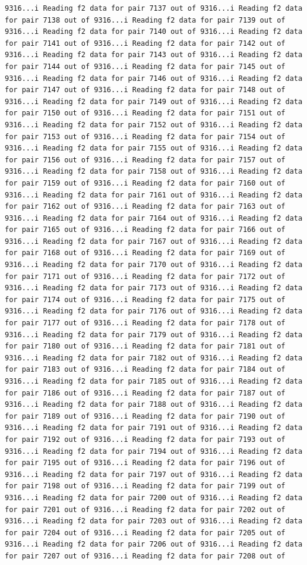 \documentclass[
]{article}
\begin{document}
\begin{verbatim}
9316...i Reading f2 data for pair 7137 out of 9316...i Reading f2 data for pair 7138 out of 9316...i Reading f2 data for pair 7139 out of 9316...i Reading f2 data for pair 7140 out of 9316...i Reading f2 data for pair 7141 out of 9316...i Reading f2 data for pair 7142 out of 9316...i Reading f2 data for pair 7143 out of 9316...i Reading f2 data for pair 7144 out of 9316...i Reading f2 data for pair 7145 out of 9316...i Reading f2 data for pair 7146 out of 9316...i Reading f2 data for pair 7147 out of 9316...i Reading f2 data for pair 7148 out of 9316...i Reading f2 data for pair 7149 out of 9316...i Reading f2 data for pair 7150 out of 9316...i Reading f2 data for pair 7151 out of 9316...i Reading f2 data for pair 7152 out of 9316...i Reading f2 data for pair 7153 out of 9316...i Reading f2 data for pair 7154 out of 9316...i Reading f2 data for pair 7155 out of 9316...i Reading f2 data for pair 7156 out of 9316...i Reading f2 data for pair 7157 out of 9316...i Reading f2 data for pair 7158 out of 9316...i Reading f2 data for pair 7159 out of 9316...i Reading f2 data for pair 7160 out of 9316...i Reading f2 data for pair 7161 out of 9316...i Reading f2 data for pair 7162 out of 9316...i Reading f2 data for pair 7163 out of 9316...i Reading f2 data for pair 7164 out of 9316...i Reading f2 data for pair 7165 out of 9316...i Reading f2 data for pair 7166 out of 9316...i Reading f2 data for pair 7167 out of 9316...i Reading f2 data for pair 7168 out of 9316...i Reading f2 data for pair 7169 out of 9316...i Reading f2 data for pair 7170 out of 9316...i Reading f2 data for pair 7171 out of 9316...i Reading f2 data for pair 7172 out of 9316...i Reading f2 data for pair 7173 out of 9316...i Reading f2 data for pair 7174 out of 9316...i Reading f2 data for pair 7175 out of 9316...i Reading f2 data for pair 7176 out of 9316...i Reading f2 data for pair 7177 out of 9316...i Reading f2 data for pair 7178 out of 9316...i Reading f2 data for pair 7179 out of 9316...i Reading f2 data for pair 7180 out of 9316...i Reading f2 data for pair 7181 out of 9316...i Reading f2 data for pair 7182 out of 9316...i Reading f2 data for pair 7183 out of 9316...i Reading f2 data for pair 7184 out of 9316...i Reading f2 data for pair 7185 out of 9316...i Reading f2 data for pair 7186 out of 9316...i Reading f2 data for pair 7187 out of 9316...i Reading f2 data for pair 7188 out of 9316...i Reading f2 data for pair 7189 out of 9316...i Reading f2 data for pair 7190 out of 9316...i Reading f2 data for pair 7191 out of 9316...i Reading f2 data for pair 7192 out of 9316...i Reading f2 data for pair 7193 out of 9316...i Reading f2 data for pair 7194 out of 9316...i Reading f2 data for pair 7195 out of 9316...i Reading f2 data for pair 7196 out of 9316...i Reading f2 data for pair 7197 out of 9316...i Reading f2 data for pair 7198 out of 9316...i Reading f2 data for pair 7199 out of 9316...i Reading f2 data for pair 7200 out of 9316...i Reading f2 data for pair 7201 out of 9316...i Reading f2 data for pair 7202 out of 9316...i Reading f2 data for pair 7203 out of 9316...i Reading f2 data for pair 7204 out of 9316...i Reading f2 data for pair 7205 out of 9316...i Reading f2 data for pair 7206 out of 9316...i Reading f2 data for pair 7207 out of 9316...i Reading f2 data for pair 7208 out of 
\end{verbatim}
\end{document}
